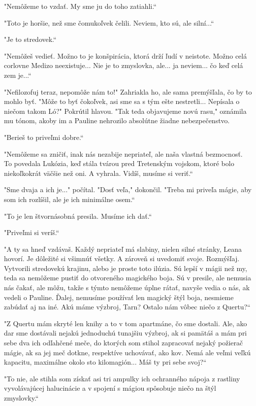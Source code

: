 \documentclass{book}
\begin{document}
"$ $Nemôžeme to vzdať. My sme ju do toho zatiahli.“

"$ $Toto je horšie, než sme čomukoľvek čelili. Neviem, kto sú, ale silní...“

"$ $Je to stredovek.“

"$ $Nemôžeš vedieť. Možno to je konšpirácia, ktorá drží ľudí v neistote. Možno celá corlovne Medizo neexistuje... Nie je to zmyslovka, ale... ja neviem... čo keď celá zem je...“

"$ $Nefilozofuj teraz, nepomôže nám to!"$ $ Zahriakla ho, ale sama premýšľala, čo by to mohlo byť. "$ $Môže to byť čokoľvek, asi sme sa s tým ešte nestretli... Nepísala o niečom takom Ló?"$ $ Pokrútil hlavou. "$ $Tak teda objavujeme novú rasu,"$ $ oznámila mu tónom, akoby im a Pauline nehrozilo absolútne žiadne nebezpečenstvo.

"$ $Berieš to priveľmi dobre.“

"$ $Nemôžeme sa zničiť, inak nás nezabije nepriateľ, ale naša vlastná bezmocnosť. To povedala Lukózia, keď stála tvárou pred Tretenským vojskom, ktoré bolo niekoľkokrát väčšie než oni. A vyhrala. Vidíš, musíme si veriť.“

"$ $Sme dvaja a ich je..."$ $ počítal. "$ $Dosť veľa,"$ $ dokončil. "$ $Treba mi priveľa mágie, aby som ich rozlíšil, ale je ich minimálne osem.“

"$ $To je len štvornásobná presila. Musíme ich dať.“

"$ $Priveľmi si veríš.“

"$ $A ty sa hneď vzdávaš. Každý nepriateľ má slabiny, nielen silné stránky, Leana hovorí. Je dôležité si všimnúť všetky. A zároveň si uvedomiť svoje. Rozmýšľaj. Vytvorili stredovekú krajinu, alebo je proste toto ilúzia. Sú lepší v mágii než my, teda sa nemôžeme pustiť do otvoreného magického boja. Sú v presile, ale nemusia nás čakať, ale môžu, takže s týmto nemôžeme úplne rátať, navyše vedia o nás, ak vedeli o Pauline. Ďalej, nemusíme používať len magický štýl boja, nesmieme zabúdať aj na iné. Akú máme výzbroj, Tarn? Ostalo nám vôbec niečo z Quertu?“

"$ $Z Quertu mám skryté len knihy a to v tom apartmáne, čo sme dostali. Ale, ako dar sme dostávali nejakú jednoduchú tunajšiu výzbroj, ak si pamätáš a mám pri sebe dva ich odľahčené meče, do ktorých som stihol zapracovať nejaký požierač mágie, ak sa jej meč dotkne, respektíve uchovávať, ako kov. Nemá ale veľmi veľkú kapacitu, maximálne okolo sto kilomagión... Máš ty pri sebe svoj?“

"$ $To nie, ale stihla som získať asi tri ampulky ich ochranného nápoja z rastliny vyvolávajúcej halucinácie a v spojení s mágiou spôsobuje niečo na štýl zmyslovky.“
\end{document}
